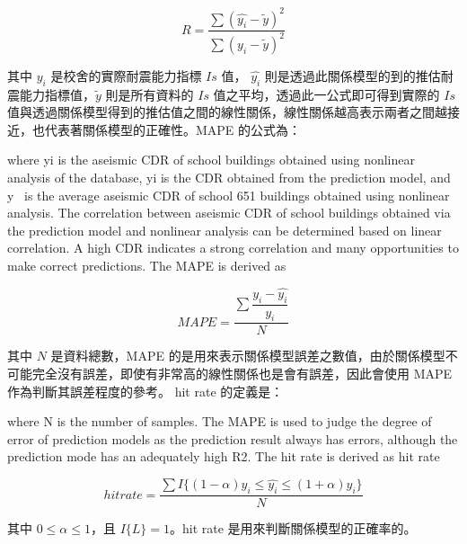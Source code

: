 \begin{equation} R = \dfrac{\sum{(\hat{y_i} - \tilde{y})^2}}{\sum{(y_i - \tilde{y})^2}} \label{eq:RSQ}\end{equation} 

其中 $y_i$ 是校舍的實際耐震能力指標 $Is$ 值， $\hat{y_i}$ 則是透過此關係模型的到的推估耐震能力指標值，$\tilde{y}$ 則是所有資料的 $Is$ 值之平均，透過此一公式即可得到實際的 $Is$ 值與透過關係模型得到的推估值之間的線性關係，線性關係越高表示兩者之間越接近，也代表著關係模型的正確性。MAPE 的公式為：

where yi is the aseismic CDR of school buildings obtained using nonlinear analysis of the database, yi is the CDR obtained from the prediction model, and y~ is the average aseismic CDR of school 651 buildings obtained using nonlinear analysis. The correlation between aseismic CDR of school buildings obtained via the prediction model and nonlinear analysis can be determined based on linear correlation. A high CDR indicates a strong correlation and many opportunities to make correct predictions. The MAPE is derived as

\begin{equation} MAPE = \dfrac{\sum{\dfrac{y_i - \hat{y_i}}{y_i}}}{N} \label{eq:MAPE}\end{equation} 

其中 $N$ 是資料總數，MAPE 的是用來表示關係模型誤差之數值，由於關係模型不可能完全沒有誤差，即使有非常高的線性關係也是會有誤差，因此會使用 MAPE 作為判斷其誤差程度的參考。 hit rate 的定義是：

where N is the number of samples. The MAPE is used to judge the  degree of error of prediction models as the prediction result always has errors, although the prediction mode has an adequately high R2. The hit rate is derived as 
hit rate

\begin{equation} hit rate = \dfrac{ \sum{I\{(1 - \alpha)y_i \le \hat{y_i} \le (1 + \alpha)y_i \}} }{N} \label{eq:hitrate}\end{equation} 

其中 $0 \le \alpha \le 1$，且 $I\{L\} = 1$。hit rate 是用來判斷關係模型的正確率的。

